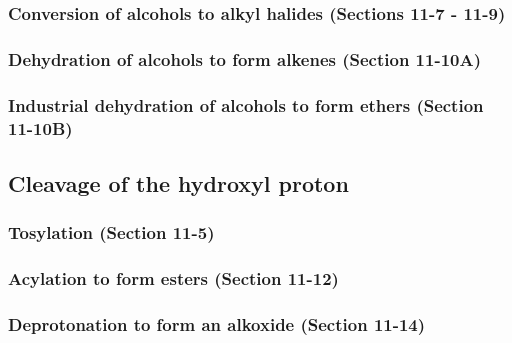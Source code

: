 \subsubsection{Conversion of alcohols to alkyl halides \normalfont(Sections 11-7 - 11-9)}


\subsubsection{Dehydration of alcohols to form alkenes \normalfont(Section 11-10A)}


\subsubsection{Industrial dehydration of alcohols to form ethers \normalfont(Section 11-10B)}



\subsection{Cleavage of the hydroxyl proton}

\subsubsection{Tosylation \normalfont(Section 11-5)}


\subsubsection{Acylation to form esters \normalfont(Section 11-12)}


\subsubsection{Deprotonation to form an alkoxide \normalfont(Section 11-14)}

